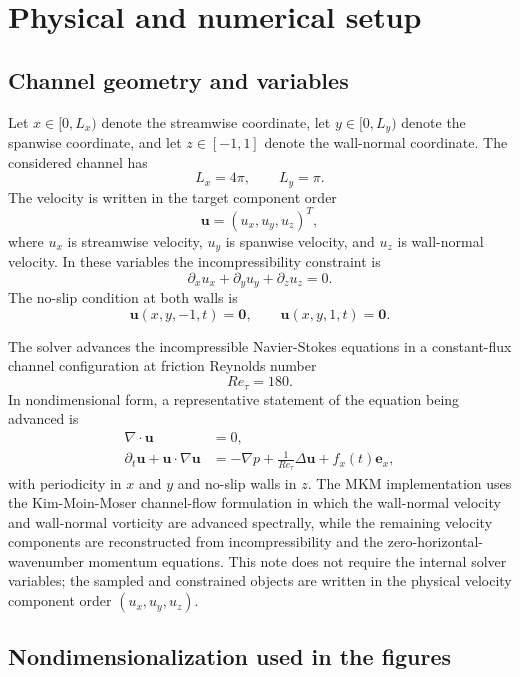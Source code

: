 \documentclass[11pt]{article}
\newcommand{\bfu}{\bm{u}}
\newcommand{\bfzero}{\bm{0}}
\begin{document}
\section{Physical and numerical setup}

\subsection{Channel geometry and variables}

Let \(x\in[0,L_x)\) denote the streamwise coordinate, let \(y\in[0,L_y)\)
denote the spanwise coordinate, and let \(z\in[-1,1]\) denote the wall-normal
coordinate. The considered channel has
\[
  L_x = 4\pi,\qquad L_y=\pi.
\]
The velocity is written in the target component order
\[
  \bfu = (u_x,u_y,u_z)^T,
\]
where \(u_x\) is streamwise velocity, \(u_y\) is spanwise velocity, and \(u_z\)
is wall-normal velocity. In these variables the incompressibility constraint is
\begin{equation}
  \partial_x u_x + \partial_y u_y + \partial_z u_z = 0.
  \label{eq:continuous_divergence}
\end{equation}
The no-slip condition at both walls is
\begin{equation}
  \bfu(x,y,-1,t)=\bfzero,\qquad \bfu(x,y,1,t)=\bfzero.
  \label{eq:continuous_noslip}
\end{equation}

The solver advances the incompressible Navier-Stokes equations in a
constant-flux channel configuration at friction Reynolds number
\[
  Re_{\tau}=180.
\]
In nondimensional form, a representative statement of the equation being
advanced is
\begin{align}
  \nabla\cdot\bfu &= 0, \label{eq:ns_div}\\
  \partial_t\bfu + \bfu\cdot\nabla\bfu
    &= -\nabla p + \frac{1}{Re_{\tau}}\Delta\bfu + f_x(t)\bm{e}_x,
    \label{eq:ns_momentum}
\end{align}
with periodicity in \(x\) and \(y\) and no-slip walls in \(z\). The MKM
implementation uses the Kim-Moin-Moser channel-flow formulation in which the
wall-normal velocity and wall-normal vorticity are advanced spectrally, while
the remaining velocity components are reconstructed from incompressibility and
the zero-horizontal-wavenumber momentum equations. This note does not require
the internal solver variables; the sampled and constrained objects are written
in the physical velocity component order \((u_x,u_y,u_z)\).

\subsection{Nondimensionalization used in the figures}
\end{document}
